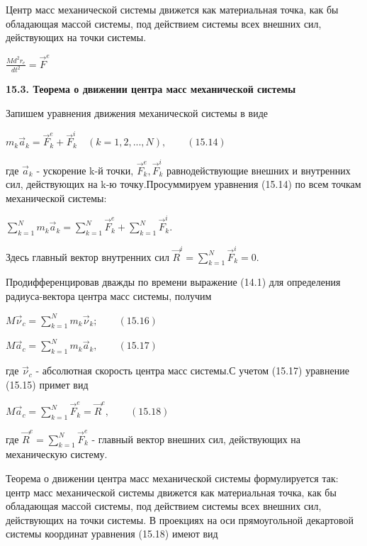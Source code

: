 {\begin{center}
\par Центр масс механической системы движется как материальная точка, как бы обладающая массой системы, под действием системы всех внешних сил, действующих на точки системы.

\par $\frac{Md^2 r_e}{d t^2} = \vec F^e$

\par\textbf{15.3. Теорема о движении центра масс механической системы}

\par Запишем уравнения движения механической системы в виде

\par $m_k \vec a_k = \vec F_k^e + \vec F_k^i \quad (k=1,2,...,N), \qquad(15.14)$

\par где $\vec a_k$ - ускорение k-й точки, $\vec F_k^e, \vec F_k^i$ равнодействующие внешних и внутренних сил, действующих на k-ю точку.Просуммируем уравнения (15.14) по всем точкам механической системы:

\par $\sum\limits_{k=1}^N m_k \vec a_k = \sum\limits_{k=1}^N \vec F_k^e + \sum\limits_{k=1}^N \vec F_k^i $.

\par Здесь главный вектор внутренних сил $\vec R^i = \sum\limits_{k=1}^N \vec F_k^i = 0$.

\par Продифференцировав дважды по времени выражение (14.1) для определения радиуса-вектора центра масс системы, получим

\par $M \vec\nu_c = \sum\limits_{k=1}^N m_k \vec\nu_k; \qquad (15.16)$
\par $M \vec a_c = \sum\limits_{k=1}^N m_k \vec a_k, \qquad (15.17)$

\par где $\vec\nu_c$ - абсолютная скорость центра масс системы.С учетом (15.17) уравнение (15.15) примет вид

\par $M \vec a_c = \sum\limits_{k=1}^N \vec F_k^e = \vec R^e, \qquad(15.18)$

\par где $ \vec R^e = \sum\limits_{k=1}^N \vec F_k^e$ - главный вектор внешних сил, действующих на механическую систему.

\par Теорема о движении центра масс механической системы формулируется так: центр масс механической системы движется как материальная точка, как бы обладающая массой системы, под действием системы всех внешних сил, действующих на точки системы. В проекциях на оси прямоугольной декартовой системы координат уравнения (15.18) имеют вид


\end{center}}
